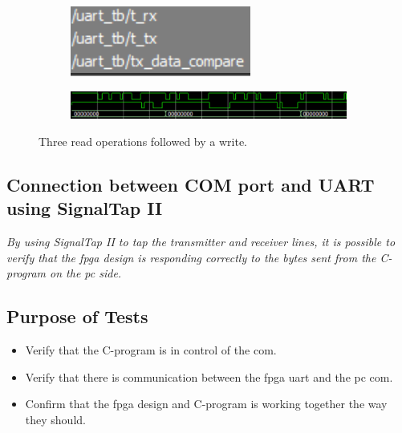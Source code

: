 \documentclass[main.tex]{subfiles}
\begin{document}
\begin{figure}
    \centering
    \begin{subfigure}{0.18\textwidth}
        \centering
        \includegraphics[width=\linewidth]{../img/uart_tb_0}
    \end{subfigure}%
    \begin{subfigure}{0.7\textwidth}
        \centering
        \includegraphics[width=\linewidth]{../img/uart_tb_1}
    \end{subfigure}
    \caption{Three read operations followed by a write. }
    \label{fig:uarttb}
\end{figure}

\subsection{Connection between COM port and UART using SignalTap II}

\textit{By using SignalTap II to tap the transmitter and receiver lines, it is possible to verify that the \gls{fpga} design is responding correctly to the bytes sent from the C-program on the \gls{pc} side.} 

\subsection{Purpose of Tests}
\begin{itemize}\setlength{\itemsep}{10pt}
\item Verify that the C-program is in control of the \gls{com}.
\item Verify that there is communication between the \gls{fpga} \gls{uart} and the \gls{pc} \gls{com}.
\item Confirm that the \gls{fpga} design and C-program is working together the way they should.
\end{itemize}
\end{document}

